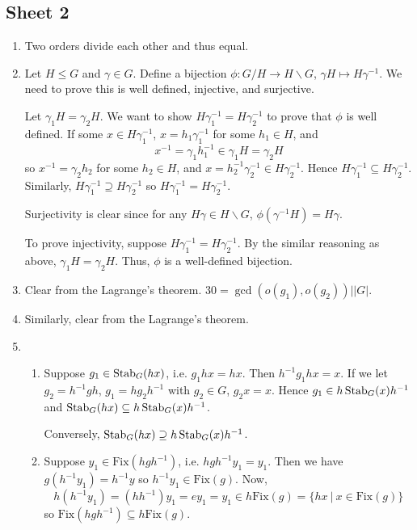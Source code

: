 \documentclass[10pt, a4paper, twoside]{report}
\begin{document}
\subsection{Sheet 2}
\begin{enumerate}[{1.}]
    \item Two orders divide each other and thus equal.
    \item Let \(H\leq G\) and \(\gamma\in G\). Define a bijection \(\phi:G/H\to H\backslash G\), \(\gamma H\mapsto H\gamma^{-1}\). We need to prove this is well defined, injective, and surjective.
    
    Let \(\gamma_1 H=\gamma_2 H\). We want to show \(H\gamma_1^{-1}=H\gamma_2^{-1}\) to prove that \(\phi\) is well defined.  If some \(x\in H\gamma_1^{-1}\), \(x=h_1\gamma_1^{-1}\) for some \(h_1\in H\), and 
    \[x^{-1}=\gamma_1h_1^{-1}\in\gamma_1 H=\gamma_2 H\]
    so \(x^{-1}=\gamma_2h_2\) for some \(h_2\in H\), and \(x=h_2^{-1}\gamma_2^{-1}\in H\gamma_2^{-1}\). Hence \(H\gamma_1^{-1}\subseteq H\gamma_2^{-1}\). Similarly, \(H\gamma_1^{-1}\supseteq H\gamma_2^{-1}\) so \(H\gamma_1^{-1}=H\gamma_2^{-1}\).

    Surjectivity is clear since for any \(H\gamma\in H\backslash G\), \(\phi(\gamma^{-1}H)=H\gamma\).

    To prove injectivity, suppose \(H\gamma_1^{-1}=H\gamma_2^{-1}\). By the similar reasoning as above, \(\gamma_1H=\gamma_2H\). Thus, \(\phi\) is a well-defined bijection.
    \item Clear from the Lagrange's theorem. \(30=\gcd(o(g_1),o(g_2))\big||G|\).
    \item Similarly, clear from the Lagrange's theorem.
    \item \begin{enumerate}[{(a)}]
        \item Suppose \(g_1\in\operatorname{Stab}_G(hx)\), i.e. \(g_1hx=hx\). Then \(h^{-1}g_1hx=x\). If we let \(g_2=h^{-1}gh\), \(g_1=hg_2h^{-1}\) with \(g_2\in G\), \(g_2x=x\). Hence \(g_1\in h\operatorname{Stab}_G(x)h^{-1}\) and \(\operatorname{Stab}_G(hx)\subseteq h\operatorname{Stab}_G(x)h^{-1}\).
    
        Conversely,  \(\operatorname{Stab}_G(hx)\supseteq h\operatorname{Stab}_G(x)h^{-1}\). 
        \item Suppose \(y_1\in\text{Fix}(hgh^{-1})\), i.e. \(hgh^{-1}y_1=y_1\). Then we have \(g(h^{-1}y_1)=h^{-1}y\) so \(h^{-1}y_1\in\text{Fix}(g)\). Now, 
        \[h(h^{-1}y_1)=(hh^{-1})y_1=ey_1=y_1\in h\text{Fix}(g)=\{hx\:|\:x\in\text{Fix}(g)\}\]
        so \(\text{Fix}(hgh^{-1})\subseteq h\text{Fix}(g)\).


\end{enumerate}
\end{enumerate}
\end{document}

